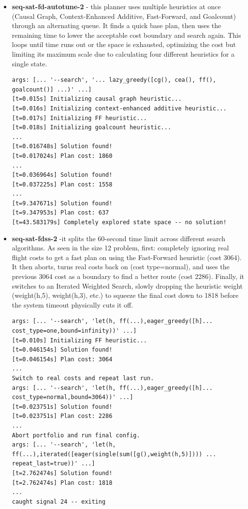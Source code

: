 \documentclass{article}
\begin{document}
\begin{itemize}
 \item \textbf{seq-sat-fd-autotune-2} - this planner uses multiple heuristics at once (Causal Graph, Context-Enhanced Additive, Fast-Forward, and Goalcount) through an alternating queue. It finds a quick base plan, then uses the remaining time to lower the acceptable cost boundary and search again. This loops until time runs out or the space is exhausted, optimizing the cost but limiting its maximum scale due to calculating four different heuristics for a single state.
  \begin{lstlisting}
args: [... '--search', '... lazy_greedy([cg(), cea(), ff(), goalcount()] ...)' ...]
[t=0.015s] Initializing causal graph heuristic...
[t=0.016s] Initializing context-enhanced additive heuristic...
[t=0.017s] Initializing FF heuristic...
[t=0.018s] Initializing goalcount heuristic...
...
[t=0.016748s] Solution found!
[t=0.017024s] Plan cost: 1860
...
[t=0.036964s] Solution found!
[t=0.037225s] Plan cost: 1558
...
[t=9.347671s] Solution found!
[t=9.347953s] Plan cost: 637
[t=43.583179s] Completely explored state space -- no solution!
  \end{lstlisting}

  \item \textbf{seq-sat-fdss-2} -it splits the 60-second time limit across different search algorithms. As seen in the size 12 problem, first: completely ignoring real flight costs to get a fast plan on using the Fast-Forward heuristic (cost 3064). It then aborts, turns real costs back on (cost type=normal), and uses the previous 3064 cost as a boundary to find a better route (cost 2286). Finally, it switches to an Iterated Weighted Search, slowly dropping the heuristic weight (weight(h,5), weight(h,3), etc.) to squeeze the final cost down to 1818 before the system timeout physically cuts it off.
\begin{lstlisting}
args: [... '--search', 'let(h, ff(...),eager_greedy([h]... cost_type=one,bound=infinity))' ...]
[t=0.010s] Initializing FF heuristic...
[t=0.046154s] Solution found!
[t=0.046154s] Plan cost: 3064
...
Switch to real costs and repeat last run.
args: [... '--search', 'let(h, ff(...),eager_greedy([h]... cost_type=normal,bound=3064))' ...]
[t=0.023751s] Solution found!
[t=0.023751s] Plan cost: 2286
...
Abort portfolio and run final config.
args: [... '--search', 'let(h, ff(...),iterated([eager(single(sum([g(),weight(h,5)]))) ... repeat_last=true))' ...]
[t=2.762474s] Solution found!
[t=2.762474s] Plan cost: 1818
...
caught signal 24 -- exiting
  \end{lstlisting}
\end{itemize}
\end{document}
